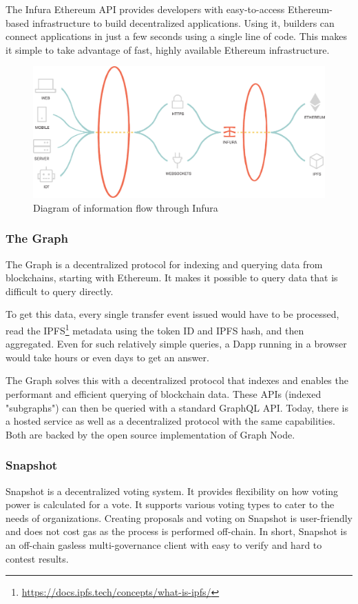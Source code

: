 \documentclass[MSE,Master,english]{twbook}%
\begin{document}
The Infura Ethereum API provides developers with easy-to-access Ethereum-based infrastructure to build decentralized applications. Using it, builders can connect applications in just a few seconds using a single line of code. This makes it simple to take advantage of fast, highly available Ethereum infrastructure. 

\begin{figure}[H]
  \centering
  \includegraphics[width=\textwidth]{infura.png}
  \caption{Diagram of information flow through Infura \cite{infura}}
  \label{fig:infura}
\end{figure}

\subsubsection{The Graph}
The Graph\cite{thegraph} is a decentralized protocol for indexing and querying data from blockchains, starting with Ethereum. It makes it possible to query data that is difficult to query directly.

To get this data, every single transfer event issued would have to be processed, read the IPFS\footnote{\url{https://docs.ipfs.tech/concepts/what-is-ipfs/}} metadata using the token ID and IPFS hash, and then aggregated. Even for such relatively simple queries, a \ac{Dapp} running in a browser would take hours or even days to get an answer.

The Graph solves this with a decentralized protocol that indexes and enables the performant and efficient querying of blockchain data. These APIs (indexed "subgraphs") can then be queried with a standard GraphQL API. Today, there is a hosted service as well as a decentralized protocol with the same capabilities. Both are backed by the open source implementation of Graph Node.

\subsubsection{Snapshot}
Snapshot\cite{snapshot} is a decentralized voting system. It provides flexibility on how voting power is calculated for a vote. It supports various voting types to cater to the needs of organizations. Creating proposals and voting on Snapshot is user-friendly and does not cost gas as the process is performed off-chain.
In short, Snapshot is an off-chain gasless multi-governance client with easy to verify and hard to contest results. \\
\end{document}
